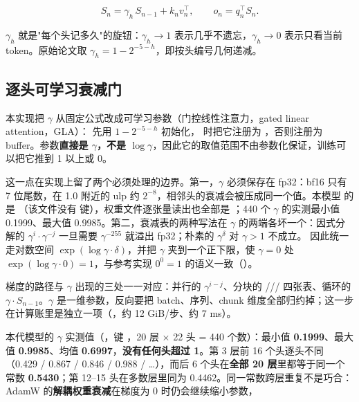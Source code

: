 \documentclass[11pt,openany]{ctexart}
\begin{document}
\[
S_n=\gamma_h\,S_{n-1}+k_n v_n^{\top},\qquad o_n=q_n^{\top}S_n .
\]

$\gamma_h$ 就是"每个头记多久"的旋钮：$\gamma_h\to1$ 表示几乎不遗忘，$\gamma_h\to0$ 表示只看当前 token。原始论文取 $\gamma_h=1-2^{-5-h}$，即按头编号几何递减。

\subsection{逐头可学习衰减门}

本实现把 $\gamma$ 从固定公式改成可学习参数（门控线性注意力，gated linear attention，GLA）： 先用 $1-2^{-5-h}$ 初始化， 时把它注册为 ，否则注册为 buffer。参数\textbf{直接是 $\gamma$，不是 $\log\gamma$}，因此它的取值范围不由参数化保证，训练可以把它推到 1 以上或 0。

这一点在实现上留了两个必须处理的边界。第一，$\gamma$ 必须保存在 fp32：bf16 只有 7 位尾数，在 1.0 附近的 ulp 约 $2^{-8}$，相邻头的衰减会被压成同一个值。本模型  的  是 （该文件没有  键），权重文件逐张量读出也全部是 ；440 个 $\gamma$ 的实测最小值 0.1999、最大值 0.9985。第二，衰减表的两种写法在 $\gamma$ 的两端各坏一个：因式分解的 $\gamma^{i}\cdot\gamma^{-j}$ 一旦需要 $\gamma^{-255}$ 就溢出 fp32；朴素的 $\gamma^{\delta}$ 对 $\gamma>1$ 不成立。 因此统一走对数空间 $\exp(\log\gamma\cdot\delta)$，并把 $\gamma$ 夹到一个正下限，使 $\gamma=0$ 处 $\exp(\log\gamma\cdot 0)=1$，与参考实现 $0^0=1$ 的语义一致（）。

梯度的路径与 $\gamma$ 出现的三处一一对应：并行的 $\gamma^{i-j}$、分块的 /// 四张表、循环的 $\gamma\cdot S_{n-1}$。$\gamma$ 是一维参数，反向要把 batch、序列、chunk 维度全部归约掉；这一步在计算账里是独立一项（，约 12 GiB/步、约 7 ms）。

本代模型的 $\gamma$ 实测值（，键 ，20 层 $\times$ 22 头 = 440 个数）：最小值 \textbf{0.1999}、最大值 \textbf{0.9985}、均值 \textbf{0.6997}，\textbf{没有任何头超过 1}。第 3 层前 16 个头逐头不同（0.429 / 0.867 / 0.846 / 0.988 / …），而后 6 个头在\textbf{全部 20 层}里都等于同一个常数 \textbf{0.5430}；第 12–15 头在多数层里同为 0.4462。同一常数跨层重复不是巧合：AdamW 的\textbf{解耦权重衰减}在梯度为 0 时仍会继续缩小参数，
\end{document}
